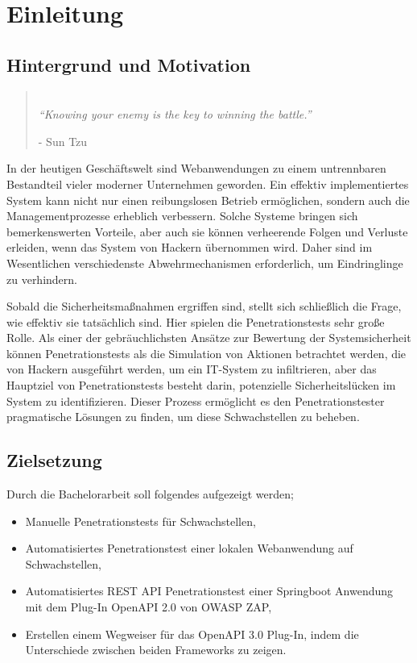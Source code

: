 \chapter{Einleitung}
\label{cha:Einleitung}

\section{Hintergrund und Motivation}

\begin{quote}
	\begin{center}
		\emph{\\
			"`Knowing your enemy is the key to winning the battle."'}
	\end{center}
	\begin{flushright}
		- Sun Tzu
	\end{flushright}
\end{quote}

In der heutigen Geschäftswelt sind Webanwendungen zu einem untrennbaren Bestandteil vieler moderner Unternehmen geworden. Ein effektiv implementiertes System kann nicht nur einen reibungslosen Betrieb ermöglichen, sondern auch die Managementprozesse erheblich verbessern. Solche Systeme bringen sich bemerkenswerten Vorteile, aber auch sie können verheerende Folgen und Verluste erleiden, wenn das System von Hackern übernommen wird. Daher sind im Wesentlichen verschiedenste Abwehrmechanismen erforderlich, um Eindringlinge zu verhindern.

Sobald die Sicherheitsmaßnahmen ergriffen sind, stellt sich schließlich die Frage, wie effektiv sie tatsächlich sind. Hier spielen die Penetrationstests sehr große Rolle. Als einer der gebräuchlichsten Ansätze zur Bewertung der Systemsicherheit können Penetrationstests als die Simulation von Aktionen betrachtet werden, die von Hackern ausgeführt werden, um ein IT-System zu infiltrieren, aber das Hauptziel von Penetrationstests besteht darin, potenzielle Sicherheitslücken im System zu identifizieren. Dieser Prozess ermöglicht es den Penetrationstester pragmatische Lösungen zu finden, um diese Schwachstellen zu beheben.

\section{Zielsetzung}

Durch die Bachelorarbeit soll folgendes aufgezeigt werden;

\begin{itemize}
	\item Manuelle Penetrationstests für Schwachstellen,
	\item Automatisiertes Penetrationstest einer lokalen Webanwendung auf Schwachstellen,
	\item Automatisiertes REST API Penetrationstest einer Springboot Anwendung mit dem Plug-In OpenAPI 2.0 von OWASP ZAP,
	\item Erstellen einem Wegweiser für das OpenAPI 3.0 Plug-In, indem die Unterschiede zwischen beiden Frameworks zu zeigen.\\
\end{itemize}

